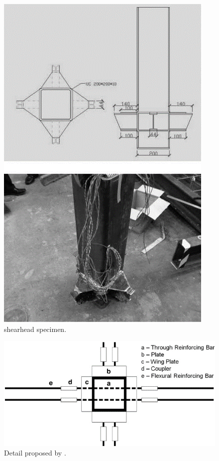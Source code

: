     \begin{figure}\centering
    \includegraphics[width=\columnwidth]{Figures/y2009f3.png}
    \caption{\cite{yan2008} shearhead specimen.}
    \label{y2009f3}
    \end{figure}
\begin{figure}\centering
    \includegraphics[width=\columnwidth]{Figures/j2013f9.png}
    \caption{Detail proposed by \cite{JU2013297}.}
    \label{j2013f9}
    \end{figure}

